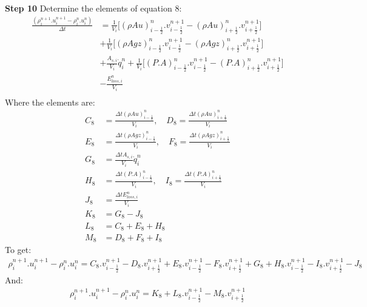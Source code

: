 \documentclass[11pt,letterpaper,titlepage]{article}
\newcommand{\half}{\frac{1}{2}}
\begin{document}
\newpage \noindent
\textbf{Step 10}\newline
Determine the elements of equation 8:
\begin{equation*}
\begin{aligned}
 \frac{(\rho_i^{n+1}.u_i^{n+1}-  \rho_i^{n}.u_i^{n})}{\Delta t}&=\frac{1}{V_i}\biggr[ (\rho Au)_{i-\half}^n.v_{i-\half}^{n+1} -(\rho Au)_{i+\half}^n.v_{i+\half}^{n+1} \biggr] \\
&+\frac{1}{V_i}\biggr[ (\rho Agz)_{i-\half}^n.v_{i-\half}^{n+1} -(\rho Agz)_{i+\half}^n.v_{i+\half}^{n+1} \biggr] \\
&+\frac{A_{s,i}}{V_i}\dot{q}_i^n + \frac{1}{V_i}\biggr[   (P.A)_{i-\half}^n.v_{i-\half}^{n+1} - (P.A)_{i+\half}^n.v_{i+\half}^{n+1}   \biggr] \\
&- \frac{E_{loss,i}^n}{V_i} \\
\end{aligned}
\end{equation*}
\newline
Where the elements are:
\begin{equation*}
\begin{aligned}
C_8&=\frac{\Delta t (\rho Au)_{i-\half}^n}{V_i}, \quad D_8=\frac{\Delta t (\rho Au)_{i+\half}^n}{V_i} \\
E_8&=\frac{\Delta t (\rho Agz)_{i-\half}^n}{V_i}, \quad F_8=\frac{\Delta t (\rho Agz)_{i+\half}^n}{V_i}\\
G_8&=\frac{\Delta t A_{s,i}}{V_i}\dot{q}_i^n \\
H_8&=\frac{\Delta t (P.A)_{i-\half}^n}{V_i}, \quad I_8=\frac{\Delta t (P.A)_{i+\half}^n}{V_i} \\
J_8&=\frac{\Delta t E_{loss,i}^n}{V_i} \\
K_8&=G_8-J_8 \\
L_8&=C_8+E_8+H_8 \\
M_8&=D_8+F_8+I_8
\end{aligned}
\end{equation*}
\newline
To get:
\begin{equation*}
\begin{aligned}
\rho_i^{n+1}.u_i^{n+1}-\rho_i^{n}.u_i^{n}=C_8.v_{i-\half}^{n+1}-D_8.v_{i+\half}^{n+1}+E_8.v_{i-\half}^{n+1}-F_8.v_{i+\half}^{n+1}+G_8+H_8.v_{i-\half}^{n+1}-I_8.v_{i+\half}^{n+1}-J_8
\end{aligned}
\end{equation*}
And:
\begin{equation}
\begin{aligned}
\rho_i^{n+1}.u_i^{n+1}-\rho_i^{n}.u_i^{n}=K_8+L_8.v_{i-\half}^{n+1}-M_8.v_{i+\half}^{n+1}
\end{aligned}
\end{equation}
\end{document}
